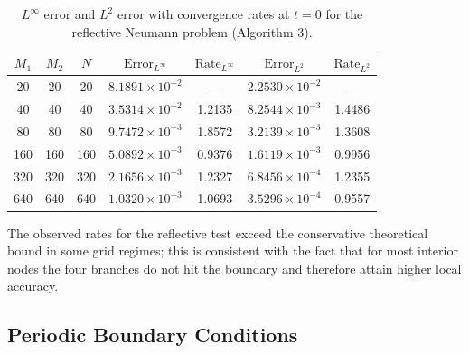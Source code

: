 \documentclass[11pt]{article}
\theoremstyle{mythm}
\theoremstyle{definition}
\begin{document}
	\begin{table}[htb]
		\centering
		\caption{$L^{\infty}$ error and $L^2$ error with convergence rates at $t=0$ for the reflective Neumann problem (Algorithm 3).}
		\label{tab:reflective}
		\small
		\begin{tabular}{@{}ccccccc@{}}
			\toprule
			\(M_1\) & \(M_2\) & \(N\) &$\text{Error}_{L^\infty}$ & $\text{Rate}_{L^\infty}$ & $\text{Error}_{L^2}$ & $\text{Rate}_{L^2}$ \\
			\midrule
			20  & 20  & 20  & \(8.1891 \times 10^{-2}\) & --- & \(2.2530 \times 10^{-2}\) & --- \\
			40  & 40  & 40  & \(3.5314 \times 10^{-2}\) & 1.2135 & \(8.2544 \times 10^{-3}\) & 1.4486 \\
			80  & 80  & 80  & \(9.7472 \times 10^{-3}\) & 1.8572 & \(3.2139 \times 10^{-3}\) & 1.3608 \\
			160 & 160 & 160 & \(5.0892 \times 10^{-3}\) & 0.9376 & \(1.6119 \times 10^{-3}\) & 0.9956 \\
			320 & 320 & 320 & \(2.1656 \times 10^{-3}\) & 1.2327 & \(6.8456 \times 10^{-4}\) & 1.2355 \\
			640 & 640 & 640 & \(1.0320 \times 10^{-3}\) & 1.0693 & \(3.5296 \times 10^{-4}\) & 0.9557 \\
			\bottomrule
		\end{tabular}
	\end{table}
	
	The observed rates for the reflective test exceed the conservative theoretical bound in some grid regimes; this is consistent with the fact that for most interior nodes the four branches do not hit the boundary and therefore attain higher local accuracy.
	
	\subsection{Periodic Boundary Conditions}
	\label{subsec:numerics-periodic}
	
\end{document}
